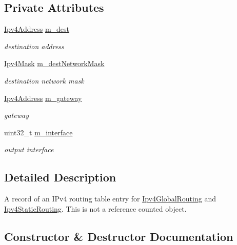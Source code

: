 \subsection*{Private Attributes}
\begin{DoxyCompactItemize}
\item 
\hyperlink{classns3_1_1Ipv4Address}{Ipv4\+Address} \hyperlink{classns3_1_1Ipv4RoutingTableEntry_a31b60a150f315d7150bd09eff4e1cd1b}{m\+\_\+dest}
\begin{DoxyCompactList}\small\item\em destination address \end{DoxyCompactList}\item 
\hyperlink{classns3_1_1Ipv4Mask}{Ipv4\+Mask} \hyperlink{classns3_1_1Ipv4RoutingTableEntry_a7cfc84bfd8af1e8dcaad6b2a30ce1244}{m\+\_\+dest\+Network\+Mask}
\begin{DoxyCompactList}\small\item\em destination network mask \end{DoxyCompactList}\item 
\hyperlink{classns3_1_1Ipv4Address}{Ipv4\+Address} \hyperlink{classns3_1_1Ipv4RoutingTableEntry_ab3263e0528494892175f5faa40ee0da8}{m\+\_\+gateway}
\begin{DoxyCompactList}\small\item\em gateway \end{DoxyCompactList}\item 
uint32\+\_\+t \hyperlink{classns3_1_1Ipv4RoutingTableEntry_a4e7f2149b9b7af1599b75ff5072ce2c2}{m\+\_\+interface}
\begin{DoxyCompactList}\small\item\em output interface \end{DoxyCompactList}\end{DoxyCompactItemize}


\subsection{Detailed Description}
A record of an I\+Pv4 routing table entry for \hyperlink{classns3_1_1Ipv4GlobalRouting}{Ipv4\+Global\+Routing} and \hyperlink{classns3_1_1Ipv4StaticRouting}{Ipv4\+Static\+Routing}. This is not a reference counted object. 

\subsection{Constructor \& Destructor Documentation}
